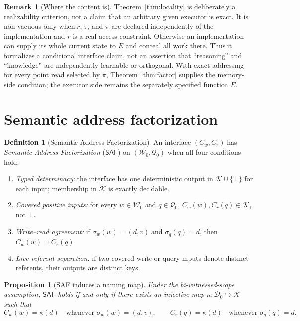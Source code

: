 \documentclass[11pt]{article}
\theoremstyle{definition}
\newtheorem{definition}{Definition}
\newtheorem{remark}{Remark}
\theoremstyle{plain}
\newtheorem{proposition}{Proposition}
\newcommand{\Dom}{\mathcal{D}}
\newcommand{\Wr}{\mathcal{W}}
\newcommand{\Qu}{\mathcal{Q}}
\newcommand{\Ky}{\mathcal{K}}
\newcommand{\bt}{\bot}
\newcommand{\semw}{\sigma_w}
\newcommand{\semq}{\sigma_q}
\newcommand{\SAF}{\mathsf{SAF}}
\begin{document}
\begin{remark}[Where the content is]
Theorem~\ref{thm:locality} is deliberately a realizability criterion, not a
claim that an arbitrary given executor is exact.  It is non-vacuous only when
\(r\), \(\tau\), and \(\pi\) are declared independently of the implementation
and \(r\) is a real access constraint.  Otherwise an implementation can
supply its whole current state to \(E\) and conceal all work there.  Thus it
formalizes a conditional interface claim, not an assertion that ``reasoning''
and ``knowledge'' are independently learnable or orthogonal.  With exact
addressing for every point read selected by \(\pi\),
Theorem~\ref{thm:factor} supplies the memory-side condition; the executor
side remains the separately specified function \(E\).
\end{remark}

\section{Semantic address factorization}

\begin{definition}[Semantic Address Factorization]\label{def:saf}
An interface \((C_w,C_r)\) has \emph{Semantic Address Factorization}
(\(\SAF\)) on \((\Wr_0,\Qu_0)\) when all four conditions hold:
\begin{enumerate}
  \item[(C1)] \emph{Typed determinacy:} the interface has one deterministic
  output in \(\Ky\cup\{\bt\}\) for each input; membership in \(\Ky\) is
  exactly decidable.
  \item[(C2)] \emph{Covered positive inputs:} for every \(w\in\Wr_0\) and
  \(q\in\Qu_0\), \(C_w(w),C_r(q)\in\Ky\), not \(\bt\).
  \item[(C3)] \emph{Write--read agreement:} if
  \(\semw(w)=(d,v)\) and \(\semq(q)=d\), then \(C_w(w)=C_r(q)\).
  \item[(C4)] \emph{Live-referent separation:} if two covered write or query
  inputs denote distinct referents, their outputs are distinct keys.
\end{enumerate}
\end{definition}

\begin{proposition}[SAF induces a naming map]\label{prop:naming}
Under the bi-witnessed-scope assumption, \(\SAF\) holds if and only if there
exists an injective map \(\kappa:\Dom_0\hookrightarrow\Ky\) such that
\[
 C_w(w)=\kappa(d)\quad\text{whenever }\semw(w)=(d,v),
 \qquad
 C_r(q)=\kappa(d)\quad\text{whenever }\semq(q)=d .
\]
\end{proposition}
\end{document}
